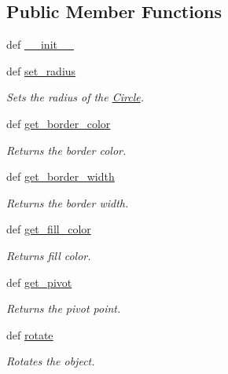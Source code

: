 \subsection*{Public Member Functions}
\begin{DoxyCompactItemize}
\item 
def \hyperlink{classcs110graphics_1_1Circle_a7c92c173c0e9666d0682c48fbd170e9f}{\_\-\_\-init\_\-\_\-}
\item 
def \hyperlink{classcs110graphics_1_1Circle_a39b0cb138b31565d2a52180a2b03cc31}{set\_\-radius}
\begin{DoxyCompactList}\small\item\em Sets the radius of the \hyperlink{classcs110graphics_1_1Circle}{Circle}. \item\end{DoxyCompactList}\item 
def \hyperlink{classcs110graphics_1_1Fillable_a6772d56158c9fe98a33f01d47cb8aa41}{get\_\-border\_\-color}
\begin{DoxyCompactList}\small\item\em Returns the border color. \item\end{DoxyCompactList}\item 
def \hyperlink{classcs110graphics_1_1Fillable_a6ed7a4288e84a090ec185c8bdff21d0f}{get\_\-border\_\-width}
\begin{DoxyCompactList}\small\item\em Returns the border width. \item\end{DoxyCompactList}\item 
def \hyperlink{classcs110graphics_1_1Fillable_a16c045bc9b63961b696914ee1a1d14d9}{get\_\-fill\_\-color}
\begin{DoxyCompactList}\small\item\em Returns fill color. \item\end{DoxyCompactList}\item 
def \hyperlink{classcs110graphics_1_1Fillable_a514fa0d21297c1372681afae9219fd58}{get\_\-pivot}
\begin{DoxyCompactList}\small\item\em Returns the pivot point. \item\end{DoxyCompactList}\item 
def \hyperlink{classcs110graphics_1_1Fillable_afa6710f6c314de39d19f06d9dd306d7d}{rotate}
\begin{DoxyCompactList}\small\item\em Rotates the object. \item\end{DoxyCompactList}\item 

\end{DoxyCompactItemize}

